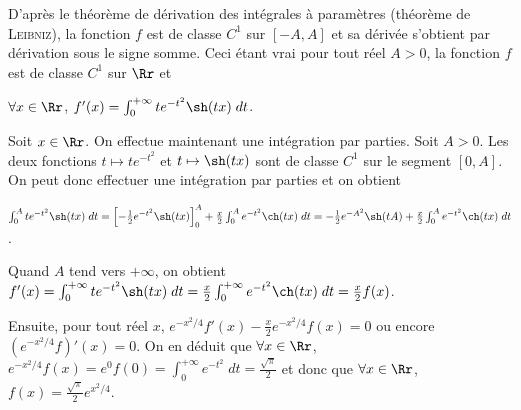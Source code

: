 {{D'après le théorème de dérivation des intégrales à paramètres (théorème de \textsc{Leibniz}), la fonction $f$ est de classe $C^1$ sur $[-A,A]$ et sa dérivée s'obtient par dérivation sous le signe somme. Ceci étant vrai pour tout réel $A>0$, la fonction $f$ est de classe $C^1$ sur $\Rr$ et

\begin{center}
$\forall x\in\Rr$, $f'(x)=\int_{0}^{+\infty}te^{-t^2}\sh(tx)\;dt$.
\end{center}

Soit $x\in\Rr$. On effectue maintenant une intégration par parties. Soit $A>0$. Les deux fonctions $t\mapsto te^{-t^2}$ et $t\mapsto\sh(tx)$ sont de classe $C^1$ sur le segment $[0,A]$. On peut donc effectuer une intégration par parties et on obtient

\begin{center}
$\int_{0}^{A}te^{-t^2}\sh(tx)\;dt=\left[-\frac{1}{2}e^{-t^2}\sh(tx)\right]_0^A+\frac{x}{2}\int_{0}^{A}e^{-t^2}\ch(tx)\;dt=-\frac{1}{2}e^{-A^2}\sh(tA)+\frac{x}{2}\int_{0}^{A}e^{-t^2}\ch(tx)\;dt$.
\end{center}

Quand $A$ tend vers $+\infty$, on obtient $f'(x)=\int_{0}^{+\infty}te^{-t^2}\sh(tx)\;dt=\frac{x}{2}\int_{0}^{+\infty}e^{-t^2}\ch(tx)\;dt=\frac{x}{2}f(x)$.

Ensuite, pour tout réel $x$, $e^{-x^2/4}f'(x)-\frac{x}{2}e^{-x^2/4}f(x)=0$ ou encore $(e^{-x^2/4}f)'(x)=0$. On en déduit que $\forall x\in\Rr$, $e^{-x^2/4}f(x)=e^0f(0)=\int_{0}^{+\infty}e^{-t^2}\;dt=\frac{\sqrt{\pi}}{2}$ et donc que $\forall x\in\Rr$, $f(x)=\frac{\sqrt{\pi}}{2}e^{x^2/4}$.

\begin{center}
\end{center}
}
}
